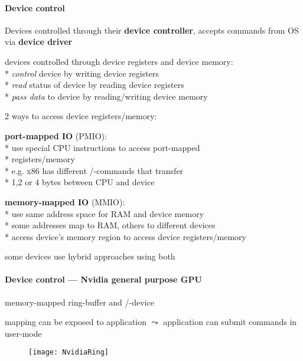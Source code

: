 \paragraph{Device control}
\begin{items}
	\item Devices controlled through their \textbf{device controller}, accepts commands from OS via \textbf{device driver}
	\item devices controlled through device registers and device memory: \\*
		\emph{control} device by writing device registers \\*
		\emph{read} status of device by reading device registers \\*
		\emph{pass data} to device by reading/writing device memory
	\item 2 ways to access device registers/memory:
	\begin{enumeration}
		\item \textbf{port-mapped IO} (PMIO): \\*
			use special CPU instructions to access port-mapped \\* \phantom{x} registers/memory \\*
			e.g. x86 has different /-commands that transfer \\* \phantom{x} 1,2 or 4 bytes between CPU and device
		\item \textbf{memory-mapped IO} (MMIO): \\*
			use same address space for RAM and device memory \\*
			some addresses map to RAM, others to different devices \\*
			access device's memory region to access device registers/memory
	\end{enumeration}
	\item some devices use hybrid approaches using both
\end{items}

\paragraph{Device control --- Nvidia general purpose GPU}
\begin{items}
	\item memory-mapped ring-buffer and /-device
	\item mapping can be exposed to application \( \leadsto \) application can submit commands in user-mode
	\begin{figure}[H]\centering\label{NvidiaRing}\texttt{[image: NvidiaRing]}\end{figure}
\end{items}

